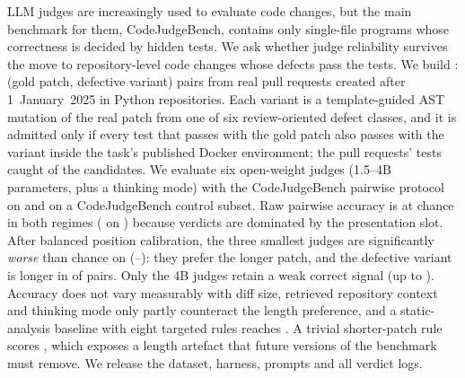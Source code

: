 LLM judges are increasingly used to evaluate code changes, but the main
benchmark for them, CodeJudgeBench, contains only single-file programs whose
correctness is decided by hidden tests.  We ask whether judge reliability
survives the move to repository-level code changes whose defects pass the
tests.  We build \RJB{}: \NPairs{} (gold patch, defective variant) pairs from
\NInstances{} real pull requests created after 1~January~2025 in \NRepos{}
Python repositories.  Each variant is a template-guided AST mutation of the
real patch from one of six review-oriented defect classes, and it is admitted
only if every test that passes with the gold patch also passes with the
variant inside the task's published Docker environment; the pull requests'
tests caught \TestCatchRate{} of the candidates.  We evaluate six open-weight
judges (1.5--4B parameters, plus a thinking mode) with the CodeJudgeBench
pairwise protocol on \RJB{} and on a CodeJudgeBench control subset.  Raw
pairwise accuracy is at chance in both regimes (\AccRangeR{} on \RJB{}) because
verdicts are dominated by the presentation slot.  After balanced position
calibration, the three smallest judges are significantly \emph{worse} than
chance on \RJB{} (\CalRCoderM{}--\CalRQwenS{}): they prefer the longer patch,
and the defective variant is longer in \VarLongerShare{} of pairs.  Only the
4B judges retain a weak correct signal (up to \CalRQwenM{}).  Accuracy does
not vary measurably with diff size, retrieved repository context and thinking
mode only partly counteract the length preference, and a static-analysis
baseline with eight targeted rules reaches \StaticRelAcc{}.  A trivial
shorter-patch rule scores \LengthHeurAcc{}, which exposes a length artefact
that future versions of the benchmark must remove.  We release the dataset,
harness, prompts and all verdict logs.
